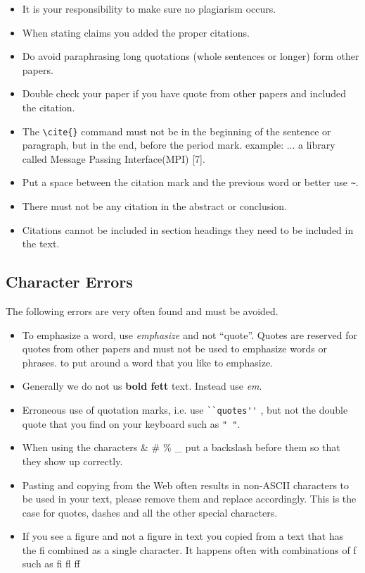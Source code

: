 \begin{itemize}[label=$\Box$]
   \item It is your responsibility to make sure no plagiarism occurs. 
   \item When stating claims you added the proper citations. 
   \item Do avoid paraphrasing long quotations (whole sentences or
     longer) form other papers.
   \item Double check your paper if you have quote from other papers
     and included the citation.
   \item The \verb|\cite{}| command must not be in the beginning of
     the sentence or paragraph, but in the end, before the period
     mark. example: ... a library called Message Passing
     Interface(MPI) [7]. 
   \item Put a space between the citation mark and the previous word
     or better use  \verb|~|.
   \item There must not be any citation in the abstract or conclusion.
   \item Citations cannot be included in section headings they need to be
     included in the text. 
\end{itemize}

\subsection{Character Errors}

The following errors are very often found and must be avoided.

\begin{itemize}[label=$\Box$]
    \item To emphasize a word, use \textit{emphasize} and not
      ``quote''. Quotes are reserved for quotes from other papers and
      must not be used to emphasize words or phrases.
      to put around a word that you like to emphasize.
    \item Generally we do not us {\bf bold fett} text. Instead use
      \textit{em}.
    \item Erroneous use of quotation marks, i.e. use \verb|``quotes''| ,
       but not the double quote that you find on your keyboard such as
       \verb|" "|.
    \item When using the characters \& \# \% \_ put a backslash before
      them so that they show up correctly.
    \item Pasting and copying from the Web often results in non-ASCII
      characters to be used in your text, please remove them and
      replace accordingly. This is the case for quotes, dashes and all
      the other special characters.
    \item If you see a f\hspace{-0.05cm}igure and not a figure in text
      you copied from a text that has the fi combined as a single
      character. It happens often with combinations of f such as fi fl
      ff
\end{itemize}

